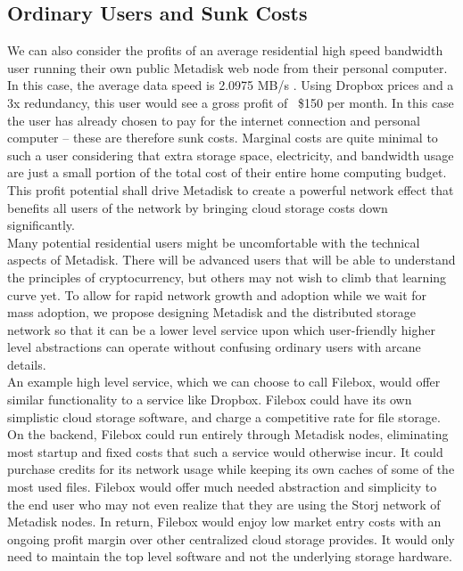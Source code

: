 \documentclass[a4paper,10pt]{article}
\begin{document}
\subsection*{Ordinary Users and Sunk Costs}

We can also consider the profits of an average residential high speed bandwidth user running their own public Metadisk web node from their personal computer. In this case, the average data speed is 2.0975 MB/s \cite{11}. Using Dropbox prices and a 3x redundancy, this user would see a gross profit of ~\$150 per month. In this case the user has already chosen to pay for the internet connection and personal computer -- these are therefore sunk costs. Marginal costs are quite minimal to such a user considering that extra storage space, electricity, and bandwidth usage are just a small portion of the total cost of their entire home computing budget.  This profit potential shall drive Metadisk to create a powerful network effect that benefits all users of the network by bringing cloud storage costs down significantly.\\
 
Many potential residential users might be uncomfortable with the technical aspects of  Metadisk. There will be advanced users that will be able to understand the principles of cryptocurrency, but others may not wish to climb that learning curve yet.  To allow for rapid network growth and adoption while we wait for mass adoption, we propose designing Metadisk and the distributed storage network so that it can be a lower level service upon which user-friendly higher level abstractions can operate without confusing ordinary users with arcane details.\\

An example high level service, which we can choose to call Filebox, would offer similar functionality to a service like Dropbox. Filebox could have its own simplistic cloud storage software, and charge a competitive rate for file storage. On the backend, Filebox could run entirely through Metadisk nodes, eliminating most startup and fixed costs that such a service would otherwise incur. It could purchase credits for its network usage while keeping its own caches of some of the most used files. Filebox would offer much needed abstraction and simplicity to the end user who may not even realize that they are using the Storj network of Metadisk nodes. In return, Filebox would enjoy low market entry costs with an ongoing profit margin over other centralized cloud storage provides. It would only need to maintain the top level software and not the underlying storage hardware.
\end{document}
